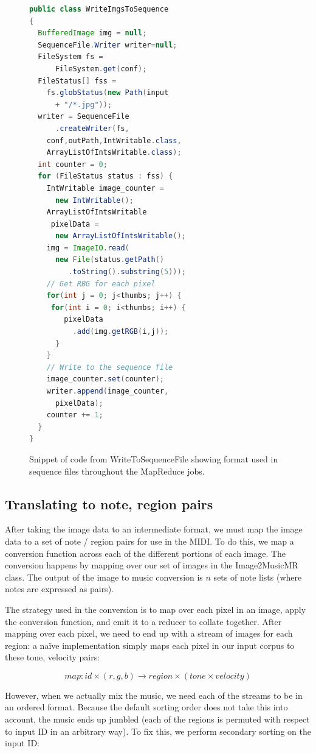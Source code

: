 \documentclass[10pt, conference, compsocconf]{IEEEtran}
\newcommand{\code}[1]{\textsf{\small #1}}
\begin{document}
\begin{figure}
\begin{lstlisting}[language=Java]
public class WriteImgsToSequence
{
  BufferedImage img = null;
  SequenceFile.Writer writer=null;
  FileSystem fs = 
      FileSystem.get(conf);
  FileStatus[] fss = 
    fs.globStatus(new Path(input 
      + "/*.jpg"));
  writer = SequenceFile
      .createWriter(fs, 
    conf,outPath,IntWritable.class,
    ArrayListOfIntsWritable.class);
  int counter = 0;
  for (FileStatus status : fss) {
    IntWritable image_counter = 
      new IntWritable();
    ArrayListOfIntsWritable 
     pixelData = 
      new ArrayListOfIntsWritable();
    img = ImageIO.read(
      new File(status.getPath()
         .toString().substring(5)));
    // Get RBG for each pixel 
    for(int j = 0; j<thumbs; j++) {
     for(int i = 0; i<thumbs; i++) {
        pixelData
          .add(img.getRGB(i,j));
      }
    }
    // Write to the sequence file
    image_counter.set(counter);
    writer.append(image_counter,
      pixelData);
    counter += 1;
  } 
}
\end{lstlisting}
\caption{Snippet of code from \code{WriteToSequenceFile} showing
  format used in sequence files throughout the MapReduce jobs.}
\end{figure}

\subsection{Translating to note, region pairs}

After taking the image data to an intermediate format, we must map the
image data to a set of note / region pairs for use in the MIDI.  To do
this, we map a conversion function across each of the different
portions of each image.  The conversion happens by mapping over our
set of images in the \code{Image2MusicMR} class.  The output of the
image to music conversion is $n$ sets of note lists (where notes are
expressed as pairs).  

The strategy used in the conversion is to map over each pixel in an
image, apply the conversion function, and emit it to a reducer to
collate together.  After mapping over each pixel, we need to end up
with a stream of images for each region: a na\"{i}ve implementation simply
maps each pixel in our input corpus to these tone, velocity pairs:

\[
  map : id \times (r,g,b) \to region \times (tone \times velocity)
\]

However, when we actually mix the music, we need each of the streams
to be in an ordered format.  Because the default sorting order does
not take this into account, the music ends up jumbled (each of the
regions is permuted with respect to input ID in an arbitrary way).  To
fix this, we perform secondary sorting on the input ID:
\end{document}
